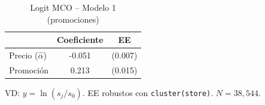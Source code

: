 \begin{table}[H]
\centering
\caption{Logit MCO -- Modelo 1 (promociones)}
\begin{tabular}{lcc}
\toprule
& Coeficiente & EE \\
\midrule
Precio ($\hat{\alpha}$) & -0.051 & (0.007) \\
Promoci\'on & 0.213 & (0.015) \\
\bottomrule
\end{tabular}

\smallskip
{\footnotesize\begin{minipage}{0.92\linewidth}VD: $y=\ln(s_j/s_0)$. EE robustos con \texttt{cluster(store)}. $N=38{,}544$.\end{minipage}}
\end{table}
